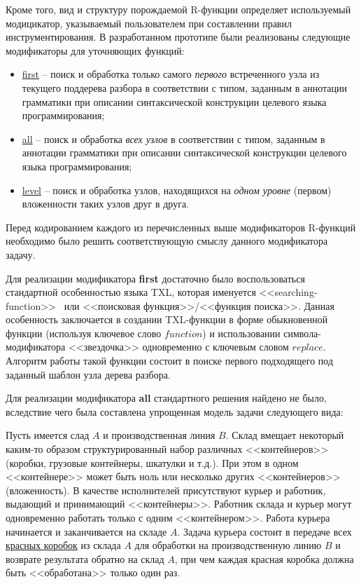 Кроме того, вид и структуру порождаемой R-функции определяет используемый модицикатор, указываемый пользователем при составлении правил инструментирования.
В разработанном прототипе были реализованы следующие модификаторы для уточняющих функций:

\begin{itemize}[noitemsep]
  \item \underline{first} -- поиск и обработка только самого \textit{первого} встреченного узла из текущего поддерева разбора в соответствии с типом, заданным в аннотации грамматики при описании синтаксической конструкции целевого языка программирования;
  \item \underline{all}   -- поиск и обработка \textit{всех узлов} в соответствии с типом, заданным в аннотации грамматики при описании синтаксической конструкции целевого языка программирования;
  \item \underline{level} -- поиск и обработка узлов, находящихся на \textit{одном уровне} (первом) вложенности таких узлов друг в друга.
\end{itemize}

Перед кодированием каждого из перечисленных выше модификаторов R-функций необходимо было решить соответствующую смыслу данного модификатора задачу.

Для реализации модификатора \textbf{first} достаточно было воспользоваться стандартной особенностью языка TXL, которая именуется <<searching-function>>~\cite{txl-book} или <<поисковая функция>>/<<функция поиска>>.
Данная особенность заключается в создании TXL-функции в форме обыкновенной функции (используя ключевое слово $function$) и использовании символа-модификатора <<звездочка>> одновременно с ключевым словом $replace$.
Алгоритм работы такой функции состоит в поиске первого подходящего под заданный шаблон узла дерева разбора.

Для реализации модификатора \textbf{all} стандартного решения найдено не было, вследствие чего была составлена упрощенная модель задачи следующего вида:

Пусть имеется слад $A$ и производственная линия $B$.
Склад вмещает некоторый каким-то образом структурированный набор различных <<контейнеров>> (коробки, грузовые контейнеры, шкатулки и т.д.).
При этом в одном <<контейнере>> может быть ноль или несколько других <<контейнеров>> (вложенность).
В качестве исполнителей присутствуют курьер и работник, выдающий и принимающий <<контейнеры>>.
Работник склада и курьер могут одновременно работать только с одним <<контейнером>>.
Работа курьера начинается и заканчивается на складе $A$.
Задача курьера состоит в передаче всех \underline{красных коробок} из склада $A$ для обработки на производственную линию $B$ и возврате результата обратно на склад $A$, при чем каждая красная коробка должна быть <<обработана>> только один раз.

